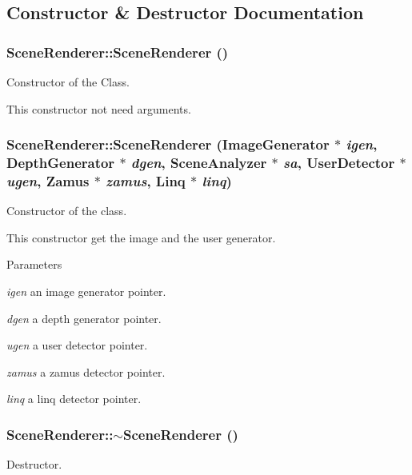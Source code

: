 \subsection{Constructor \& Destructor Documentation}
\hypertarget{classSceneRenderer_a925fa6a7da05d79bf80ea806912665a7}{
\subsubsection[{SceneRenderer}]{\setlength{\rightskip}{0pt plus 5cm}SceneRenderer::SceneRenderer ()}}
\label{classSceneRenderer_a925fa6a7da05d79bf80ea806912665a7}
Constructor of the Class.

This constructor not need arguments. \hypertarget{classSceneRenderer_a0226fa3a32e9f5fcb1f155301713de85}{
\subsubsection[{SceneRenderer}]{\setlength{\rightskip}{0pt plus 5cm}SceneRenderer::SceneRenderer (ImageGenerator $\ast$ {\em igen}, \/  DepthGenerator $\ast$ {\em dgen}, \/  SceneAnalyzer $\ast$ {\em sa}, \/  {\bf UserDetector} $\ast$ {\em ugen}, \/  {\bf Zamus} $\ast$ {\em zamus}, \/  {\bf Linq} $\ast$ {\em linq})}}
\label{classSceneRenderer_a0226fa3a32e9f5fcb1f155301713de85}
Constructor of the class.

This constructor get the image and the user generator.


\begin{DoxyParams}{Parameters}
\item[{\em igen}]an image generator pointer. \item[{\em dgen}]a depth generator pointer. \item[{\em ugen}]a user detector pointer. \item[{\em zamus}]a zamus detector pointer. \item[{\em linq}]a linq detector pointer. \end{DoxyParams}
\hypertarget{classSceneRenderer_aceec75b5c04861c2a5c26349c2ba5748}{
\subsubsection[{$\sim$SceneRenderer}]{\setlength{\rightskip}{0pt plus 5cm}SceneRenderer::$\sim$SceneRenderer ()}}
\label{classSceneRenderer_aceec75b5c04861c2a5c26349c2ba5748}
Destructor. 

